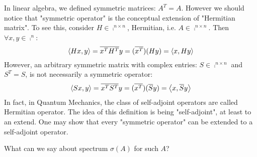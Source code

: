 \begin{remark}\nl
	In linear algebra, we defined symmetric matrices: $A^T=A$. However we should notice that "symmetric operator" is the conceptual extension of "Hermitian matrix". To see this, consider $H\in\comp^{n\times n}$, Hermitian, i.e. $A\in\comp^{n\times n}$. Then $\forall x,y\in\comp^n$:
	$$
	\left<{Hx},{y}\right>=\overline{x^TH^T}y=(\overline{x^T})(Hy)=\left<{x},{Hy}\right>
	$$
	However, an arbitrary symmetric matrix with complex entries: $S\in\comp^{n\times n}$ and $S^T=S$, is not necessarily a symmetric operator:
	$$
	\left<{Sx},{y}\right>=\overline{x^TS^T}y=(\overline{x^T})(\overline{S}y)=\left<{x},{\overline{S}y}\right>
	$$
	In fact, in Quantum Mechanics, the class of self-adjoint operators are called Hermitian operator. The idea of this definition is being "self-adjoint", at least to an extend. One may show that every "symmetric operator" can be extended to a self-adjoint operator.  
\end{remark}
What can we say about spectrum $\sigma(A)$ for such $A$?


